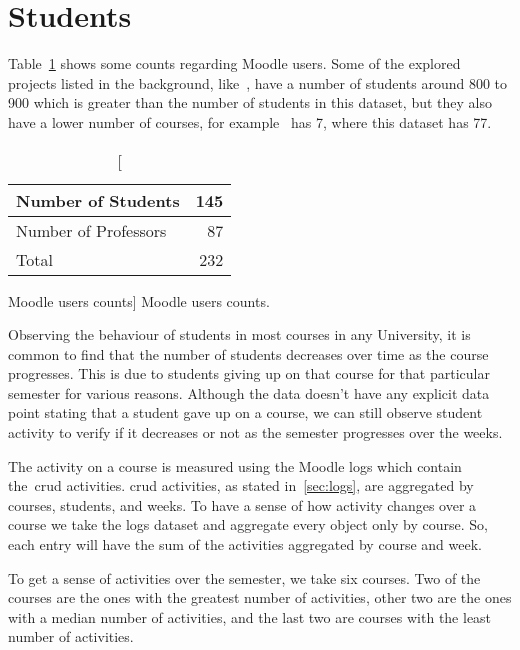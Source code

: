 \section{Students}

Table~\ref{tab:moodle_users_stats} shows some counts regarding Moodle users.
Some of the explored projects listed in the background, like~\cite{ind_001},
have a number of students around 800 to 900 which is greater than the number of
students in this dataset, but they also have a lower number of courses, for
example~\cite{ind_001} has 7, where this dataset has 77.

\begin{table}[h!]
    \centering

    \begin{tabular}{| l | r |}
        \hline
        Number of Students   & 145 \\ \hline
        Number of Professors & 87  \\ \hline
        Total                & 232 \\ \hline
    \end{tabular}

    \caption
        [Moodle users counts]
        {Moodle users counts.}

    \label{tab:moodle_users_stats}
\end{table}

Observing the behaviour of students in most courses in any University, it is
common to find that the number of students decreases over time as the course
progresses. This is due to students giving up on that course for that
particular semester for various reasons. Although the data doesn't have any
explicit data point stating that a student gave up on a course, we can still
observe student activity to verify if it decreases or not as the semester
progresses over the weeks.

The activity on a course is measured using the Moodle logs which contain
the~\gls{crud} activities. \gls{crud} activities, as stated in~\ref{sec:logs},
are aggregated by courses, students, and weeks. To have a sense of how activity
changes over a course we take the logs dataset and aggregate every object only
by course. So, each entry will have the sum of the activities aggregated by
course and week.

To get a sense of activities over the semester, we take six courses. Two of the
courses are the ones with the greatest number of activities, other two are the
ones with a median number of activities, and the last two are courses with the
least number of activities.

